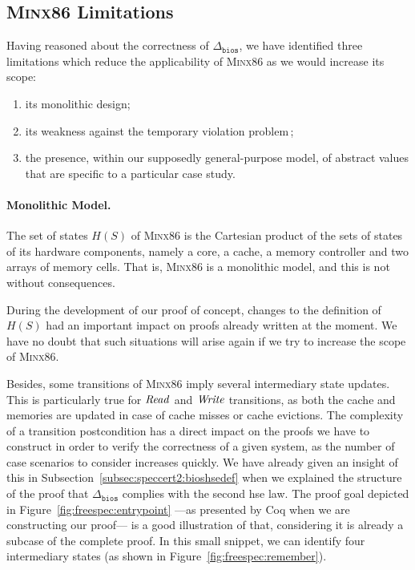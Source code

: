 \subsection{{\scshape Minx86} Limitations}
\label{subsec:freespec:minx86lim}

Having reasoned about the correctness of \( \Delta_{\mathtt{bios}} \), we have
identified three limitations which reduce the applicability of {\scshape Minx86}
as we would increase its scope:
\begin{enumerate}
\item its monolithic design;
\item its weakness against the temporary violation
  problem\,\cite{muller2006tempviolation};
\item the presence, within our supposedly general-purpose model, of abstract
  values that are specific to a particular case study.
\end{enumerate}

\paragraph{Monolithic Model.}
%
The set of states \( H(S) \) of {\scshape Minx86} is the Cartesian product of
the sets of states of its hardware components, namely a core, a cache, a memory
controller and two arrays of memory cells.
%
That is, {\scshape Minx86} is a monolithic model, and this is not without
consequences.

During the development of our proof of concept, changes to the definition of
\( H(S) \) had an important impact on proofs already written at the moment.
%
We have no doubt that such situations will arise again if we try to increase the
scope of {\scshape Minx86}.

Besides, some transitions of {\scshape Minx86} imply several intermediary state
updates.
%
This is particularly true for \( \mathit{Read} \) and \( \mathit{Write} \)
transitions, as both the cache and memories are updated in case of cache misses
or cache evictions.
%
The complexity of a transition postcondition has a direct impact on the proofs
we have to construct in order to verify the correctness of a given system, as
the number of case scenarios to consider increases quickly.
%
We have already given an insight of this in
Subsection~\ref{subsec:speccert2:bioshsedef} when we explained the structure of
the proof that \( \Delta_{\mathtt{bios}} \) complies with the second \ac{hse}
law.
%
The proof goal depicted in Figure~\ref{fig:freespec:entrypoint} ---as presented
by Coq when we are constructing our proof--- is a good illustration of that,
considering it is already a subcase of the complete proof.
%
In this small snippet, we can identify four intermediary states (as shown in
Figure~\ref{fig:freespec:remember}).

